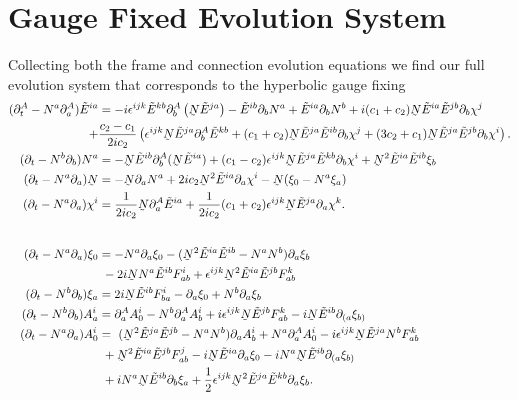\documentclass[10pt]{report}
\newcommand{\utilde}[1]{\underaccent{\tilde}{#1}}
\theoremstyle{definition}
\newcommand{\tE}[0]{\tilde{E}}
\newcommand{\dlap}[0]{\utilde{N}}
\begin{document}
    \section{Gauge Fixed Evolution System} \label{sec:pleb-num-gauge-fixed-evolution-system}
    Collecting both the frame and connection evolution equations we find our full evolution system that corresponds to the hyperbolic gauge fixing 
    \begin{align}
    (\partial^A_t - N^a \partial^A_a) \tE^{ia} & = -i \epsilon^{ijk} \tE^{kb} \partial_b^A \left(\dlap \tE^{ja}\right) - \tE^{ib} \partial_b N^a + \tE^{ia} \partial_b N^b + i(c_1 + c_2) \dlap \tE^{ia} \tE^{jb} \partial_b \chi^j \nonumber\\ + & \frac{c_2-c_1}{2 i c_2}\left( \epsilon^{ijk} \dlap \tE^{ja} \partial_b^A \tE^{kb} + (c_1+c_2) \dlap \tE^{ja} \tE^{ib} \partial_b \chi^j + (3c_2 + c_1) \dlap \tE^{ja} \tE^{jb} \partial_b \chi^i \right). \\
    (\partial_t - N^b \partial_b) N^a & = - \dlap \tE^{ib} \partial_b^A( \dlap \tE^{ia}) + (c_1 - c_2) \epsilon^{ijk} \dlap \tE^{ja} \tE^{kb} \partial_b \chi^i + \dlap^2 \tE^{ia} \tE^{ib} \xi_b  \\
    (\partial_t - N^a \partial_a)\dlap & = - \dlap \partial_a N^a + 2ic_2 \dlap^2 \tE^{ia} \partial_a \chi^i - \dlap ( \xi_0 - N^a \xi_a) \\
    (\partial_t - N^a \partial_a) \chi^i & = \frac{1}{2 i c_2} \dlap \partial^A_a \tE^{ia} + \frac{1}{2 i c_2} (c_1 + c_2) \epsilon^{ijk} \dlap \tE^{ja} \partial_a \chi^k. \\[20pt]
    (\partial_t - N^a \partial_a)\xi_0 & = - N^a \partial_a \xi_0 - (\dlap^2 \tE^{ia} \tE^{ib} - N^a N^b) \partial_a \xi_b \nonumber \\ &\  -2i \dlap N^a \tE^{ib} F^i_{ab} + \epsilon^{ijk} \dlap^2 \tE^{ia} \tE^{jb} F^k_{ab} \label{eq:num-plebanski-xi0-evolution-equation} \\
    (\partial_t - N^b \partial_b)\xi_a & = 2i \dlap \tE^{ib} F^i_{ba} - \partial_a \xi_0 + N^b \partial_a \xi_b \label{eq:num-plebanski-xia-evolution-equation}  \\
    (\partial_t - N^b \partial_b) A^i_a & = \partial^A_a A^i_0 - N^b \partial^A_a A^i_b + i \epsilon^{ijk} \dlap \tE^{jb} F^k_{ab} - i \dlap \tE^{ib} \partial_{(a} \xi_{b)} \label{eq:num-plebanski-Aia-evolution-equation}  \\
    (\partial_t - N^a \partial_a) A^i_0 & = \ (\dlap^2 \tE^{ja} \tE^{jb} - N^a N^b) \partial_a A^i_b + N^a \partial^A_a A^i_0 - i \epsilon^{ijk} \dlap \tE^{ja} N^b F^k_{ab} \nonumber \\ &\ + \dlap^2 \tE^{ia} \tE^{jb} F^j_{ab} - i \dlap \tE^{ia} \partial_a \xi_0 - i N^a \dlap \tE^{ib} \partial_{(a} \xi_{b)} \nonumber \\ &\  + i N^a \dlap \tE^{ib} \partial_b \xi_a + \frac{1}{2} \epsilon^{ijk} \dlap^2 \tE^{ja} \tE^{kb} \partial_a \xi_b. \label{eq:num-plebanski-Ai0-evolution-equation}
    \end{align}
\end{document}
